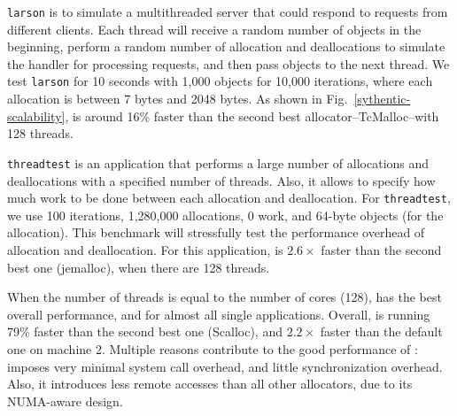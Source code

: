  \texttt{larson} is to simulate a multithreaded server that could respond to requests from different clients. Each thread  will receive a random number of objects in the beginning, perform a random number of allocation and deallocations to simulate the handler for processing requests, and then pass objects to the next thread. We test \texttt{larson} for 10 seconds with 1,000 objects for 10,000 iterations, where each allocation is between 7 bytes and 2048 bytes. As shown in Fig.~\ref{sythentic-scalability}, \NM{} is around 16\% faster than the second best allocator--TcMalloc--with 128 threads.   


\texttt{threadtest} is an application that performs a large number of allocations and deallocations with a specified number of threads. Also, it allows to specify how much work to be done between each allocation and deallocation. For \texttt{threadtest}, we use 100 iterations, 1,280,000 allocations, 0 work, and 64-byte objects (for the allocation).  This benchmark will stressfully test the performance overhead of allocation and deallocation. For this application, \NM{} is $2.6\times$ faster than the second best one (jemalloc), when there are 128 threads. %


When the number of threads is equal to the number of cores (128), \NM{} has the best overall performance, and for almost all single applications. Overall, \NM{} is running 79\% faster than the second best one (Scalloc), and  $2.2\times$ faster than the default one on machine 2.  Multiple reasons contribute to the good performance of \NM{}:  \NM{} imposes very minimal system call overhead, and little synchronization overhead. Also, it introduces less remote accesses than all other allocators, due to its NUMA-aware design. 




 

